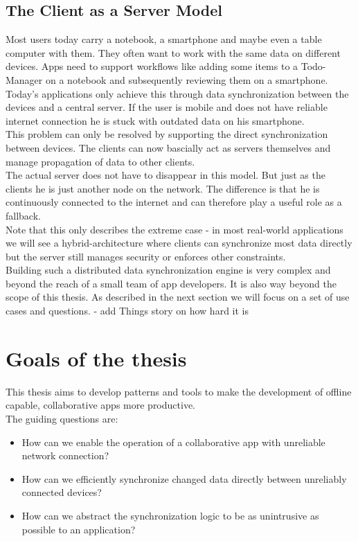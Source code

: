 \subsection{The Client as a Server Model}
Most users today carry a notebook, a smartphone and maybe even a table computer with them. They often want to work with the same data on different devices. Apps need to support workflows like adding some items to a Todo-Manager on a notebook and subsequently reviewing them on a smartphone. Today's applications only achieve this through  data synchronization between the devices and a central server. If the user is mobile and does not have reliable internet connection he is stuck with outdated data on his smartphone.\\
This problem can only be resolved by supporting the direct synchronization between devices. The clients can now bascially act as servers themselves and manage propagation of data to other clients.\\
The actual server does not have to disappear in this model. But just as the clients he is just another node on the network. The difference is that he is continuously connected to the internet and can therefore play a useful role as a fallback.\\
Note that this only describes the extreme case - in most real-world applications we will see a hybrid-architecture where clients can synchronize most data directly but the server still manages security or enforces other constraints.\\
Building such a distributed data synchronization engine is very complex and beyond the reach of a small team of app developers. It is also way beyond the scope of this thesis. As described in the next section we will focus on a set of use cases and questions.
- add Things story on how hard it is

\section{Goals of the thesis}
This thesis aims to develop patterns and tools to make the development of offline capable, collaborative apps more productive.\\

The guiding questions are:
\begin{itemize}
\item How can we enable the operation of a collaborative app with unreliable network connection?
\item How can we efficiently synchronize changed data directly between unreliably connected devices?
\item How can we abstract the synchronization logic to be as unintrusive as possible to an application?\\
\end{itemize}

